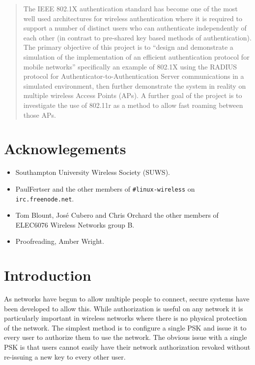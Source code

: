 \documentclass[pdftex, 12pt, a4paper]{article}
\begin{document}


\tableofcontents

\begin{abstract}
The IEEE 802.1X authentication standard has become one of the most well used architectures for wireless authentication where it is required to support a number of distinct users who can authenticate independently of each other (in contrast to pre-shared key based methods of authentication).  The primary objective of this project is to ``design and demonstrate a simulation of the implementation of an efficient authentication protocol for mobile networks'' specifically an example of 802.1X using the RADIUS protocol for Authenticator-to-Authentication Server communications in a simulated environment, then further demonstrate the system in reality on multiple wireless Access Points (APs). A further goal of the project is to investigate the use of 802.11r as a method to allow fast roaming between those APs.
\end{abstract}

\section*{Acknowlegements}
\begin{itemize}
  \item Southampton University Wireless Society (SUWS).
  \item PaulFertser and the other members of \verb`#linux-wireless` on \verb`irc.freenode.net`.
  \item Tom Blount, José Cubero and Chris Orchard the other members of ELEC6076 Wireless Networks group B.
  \item Proofreading, Amber Wright.
\end{itemize}

\section{Introduction}
As networks have begun to allow multiple people to connect, secure systems have been developed to allow this.  While authorization is useful on any network it is particularly important in wireless networks where there is no physical protection of the network. The simplest method is to configure a single PSK and issue it to every user to authorize them to use the network. The obvious issue with a single PSK is that users cannot easily have their network authorization revoked without re-issuing a new key to every other user.
\end{document}
